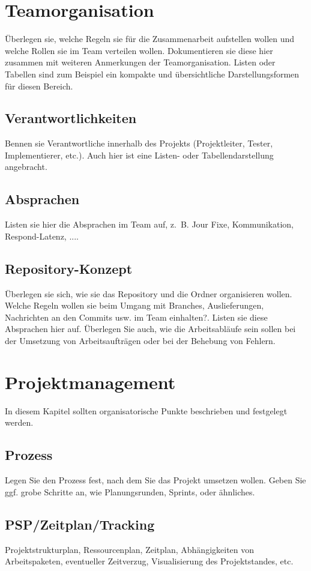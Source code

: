\documentclass[
   draft=false
  ,paper=a4
  ,twoside=true
  ,fontsize=11pt
  ,headsepline
  ,DIV11
  ,parskip=full+
]{scrartcl} %
\begin{document}
\section{Teamorganisation}
Überlegen sie, welche Regeln sie für die Zusammenarbeit aufstellen wollen und welche Rollen sie im Team verteilen wollen. Dokumentieren sie diese hier zusammen mit weiteren Anmerkungen der Teamorganisation. Listen oder Tabellen sind zum Beispiel ein kompakte und übersichtliche Darstellungsformen für diesen Bereich.
\subsection{Verantwortlichkeiten}
Bennen sie Verantwortliche innerhalb des Projekts (Projektleiter, Tester, Implementierer, etc.). Auch hier ist eine Listen- oder Tabellendarstellung angebracht.
\subsection{Absprachen}
Listen sie hier die Absprachen im Team auf, z. B. Jour Fixe, Kommunikation, Respond-Latenz, ....
\subsection{Repository-Konzept}
Überlegen sie sich, wie sie das Repository und die Ordner organisieren wollen. Welche Regeln wollen sie beim Umgang mit Branches, Auslieferungen, Nachrichten an den Commits usw. im Team einhalten?. Listen sie diese Absprachen hier auf. Überlegen Sie auch, wie die Arbeitsabläufe sein sollen bei der Umsetzung von Arbeitsaufträgen oder bei der Behebung von Fehlern.
\newpage
\section{Projektmanagement}
In diesem Kapitel sollten organisatorische Punkte beschrieben und festgelegt werden.
\subsection{Prozess}
Legen Sie den Prozess fest, nach dem Sie das Projekt umsetzen wollen. Geben Sie ggf. grobe Schritte an, wie Planungsrunden, Sprints, oder ähnliches.
\subsection{PSP/Zeitplan/Tracking}
Projektstrukturplan, Ressourcenplan, Zeitplan, Abhängigkeiten von Arbeitspaketen, eventueller Zeitverzug, Visualisierung des Projektstandes, etc.
\end{document}
